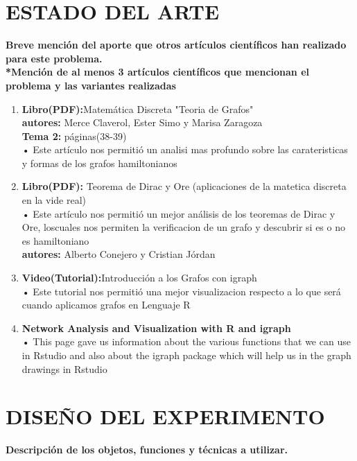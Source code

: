\documentclass[journal]{IEEEtran}
\begin{document}
\section{ESTADO DEL ARTE}
{\bf *Breve mención del aporte que otros artículos científicos han realizado para este problema.\\
*Mención de al menos 3 artículos científicos que mencionan el problema y las variantes realizadas}
\begin{enumerate}

\item \textbf{Libro(PDF):}Matem{\'a}tica Discreta "Teoria de Grafos"\\
\textbf{autores:} Merce Claverol, Ester Simo y Marisa Zaragoza\\
\textbf{Tema 2:} p{\'a}ginas(38-39)\\[1cm]
• Este art{\'i}culo nos permiti{\'o} un analisi mas profundo sobre las carateristicas y formas de los grafos hamiltonianos\\
\item \textbf{Libro(PDF):} Teorema de Dirac y Ore (aplicaciones de la matetica discreta en la vide real)\\[1cm]
• Este art{\'i}culo nos permiti{\'o} un mejor an{\'a}lisis de los teoremas de Dirac y Ore, loscuales nos permiten la verificacion de un grafo y descubrir si es o no es hamiltoniano\\ 
\textbf{autores:} Alberto Conejero y Cristian J{\'o}rdan\\[1cm]  
\item \textbf{Video(Tutorial):}Introducci{\'o}n a los Grafos con igraph\\[1cm]
• Este tutorial nos permiti{\'o} una mejor visualizacion respecto a lo que ser{\'a} cuando aplicamos grafos en Lenguaje R\\
\item \textbf{Network Analysis and Visualization with R and igraph}\\[1cm]
• This page gave us information about the various functions that we can use in Rstudio and also about the igraph package which will help us in the graph drawings in Rstudio

\end{enumerate}

\section{DISEÑO DEL EXPERIMENTO}
{\bf *Descripción de los objetos, funciones y técnicas a utilizar. }
\end{document}
